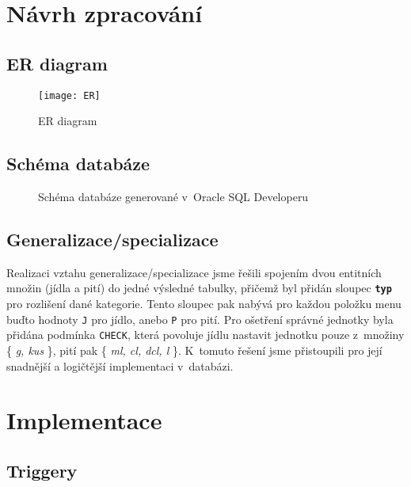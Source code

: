 \documentclass[11pt, a4paper]{article}
\begin{document}
\section{Návrh zpracování}

\subsection{ER diagram}

\begin{figure}[h]
    \centering
    \texttt{[image: ER]}
    \caption{ER diagram}
\end{figure}


\subsection{Schéma databáze}

\begin{figure}[H]
    \centering
    \caption{Schéma databáze generované v~Oracle SQL Developeru}
\end{figure}


\subsection{Generalizace/specializace}

 Realizaci vztahu generalizace/specializace jsme řešili spojením dvou entitních množin (jídla a pití) do jedné výsledné tabulky, přičemž byl přidán sloupec \textbf{\texttt{typ}} pro rozlišení dané kategorie. Tento sloupec pak nabývá pro každou položku menu buďto hodnoty \texttt{J} pro jídlo, anebo \texttt{P} pro pití. Pro ošetření správné jednotky byla přidána podmínka \texttt{CHECK}, která povoluje jídlu nastavit jednotku pouze z~množiny \{\emph{ g, kus }\}, pití pak \{\emph{ ml, cl, dcl, l }\}. K~tomuto řešení jsme přistoupili pro její snadnější a logičtější implementaci v~databázi.

\section{Implementace}

\subsection{Triggery}
\end{document}
